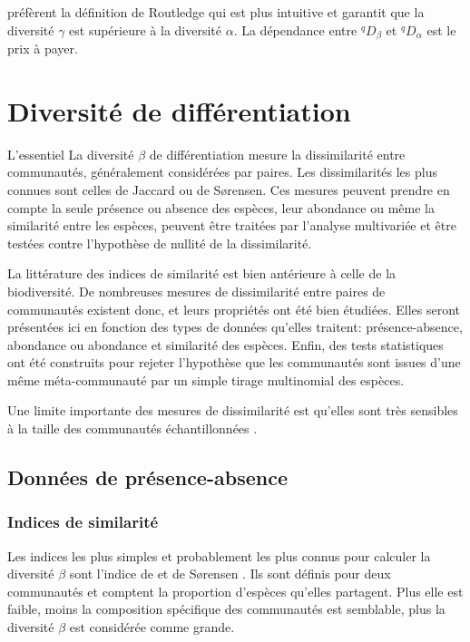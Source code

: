 \documentclass[
  11pt,
  french,
  a4paper,
  extrafontsizes,onecolumn,openright
  ]{memoir}
\newenvironment{Summary}
  {\begin{bclogo}[logo=\bctrombone, noborder=true, couleur=lightgray!50]{L'essentiel}\parindent0pt}
  {\end{bclogo}}
\begin{document}
\textcite{Marcon2014a} préfèrent la définition de Routledge qui est plus intuitive et garantit que la diversité \(\gamma\) est supérieure à la diversité \(\alpha\).
La dépendance entre \(^{q}\!D_{\beta}\) et \(^{q}\!D_{\alpha}\) est le prix à payer.

\chapter{Diversité de différentiation}\label{chap-BetaPaires}

\begin{Summary}
La diversité \(\beta\) de différentiation mesure la dissimilarité entre communautés, généralement considérées par paires.
Les dissimilarités les plus connues sont celles de Jaccard ou de Sørensen.
Ces mesures peuvent prendre en compte la seule présence ou absence des espèces, leur abondance ou même la similarité entre les espèces, peuvent être traitées par l'analyse multivariée et être testées contre l'hypothèse de nullité de la dissimilarité.

\end{Summary}

La littérature des indices de similarité est bien antérieure à celle de la biodiversité.
De nombreuses mesures de dissimilarité entre paires de communautés existent donc, et leurs propriétés ont été bien étudiées.
Elles seront présentées ici en fonction des types de données qu'elles traitent: présence-absence, abondance ou abondance et similarité des espèces.
Enfin, des tests statistiques ont été construits pour rejeter l'hypothèse que les communautés sont issues d'une même méta-communauté par un simple tirage multinomial des espèces.

Une limite importante des mesures de dissimilarité est qu'elles sont très sensibles à la taille des communautés échantillonnées \autocite{Wolda1981}.

\section{Données de présence-absence}\label{donnuxe9es-de-pruxe9sence-absence}

\subsection{Indices de similarité}\label{indices-de-similarituxe9}

Les indices les plus simples et probablement les plus connus pour calculer la diversité \(\beta\) sont l'indice de \textcite{Jaccard1901} et de Sørensen \autocite{Czekanowski1913,Dice1945,Sorensen1948}.
Ils sont définis pour deux communautés et comptent la proportion d'espèces qu'elles partagent.
Plus elle est faible, moins la composition spécifique des communautés est semblable, plus la diversité \(\beta\) est considérée comme grande.
\end{document}
